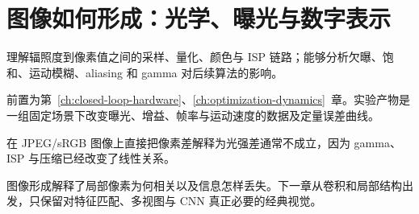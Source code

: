 \chapter{图像如何形成：光学、曝光与数字表示}
\label{ch:image-formation}

\begin{learningobjectives}
理解辐照度到像素值之间的采样、量化、颜色与 ISP 链路；能够分析欠曝、饱和、运动模糊、aliasing 和 gamma 对后续算法的影响。
\end{learningobjectives}

\begin{prerequisites}
前置为第~\ref{ch:closed-loop-hardware}、\ref{ch:optimization-dynamics}~章。实验产物是一组固定场景下改变曝光、增益、帧率与运动速度的数据及定量误差曲线。
\end{prerequisites}


\begin{failuremode}
在 JPEG/sRGB 图像上直接把像素差解释为光强差通常不成立，因为 gamma、ISP 与压缩已经改变了线性关系。
\end{failuremode}

\begin{chaptertransition}
图像形成解释了局部像素为何相关以及信息怎样丢失。下一章从卷积和局部结构出发，只保留对特征匹配、多视图与 CNN 真正必要的经典视觉。
\end{chaptertransition}

